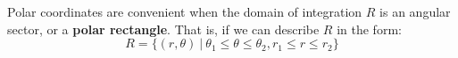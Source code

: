 






Polar coordinates are convenient when the domain of integration $R$ is an angular sector, or a \textbf{polar rectangle}.  That is, if we can describe $R$ in the form: 
    $$R = \{ (r, \theta) \ | \ {\theta_1} \leq \theta \leq {\theta_2}, r_1 \leq r \leq r_2\}$$
    

